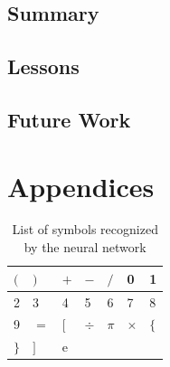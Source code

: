 \documentclass[10pt,twocolumn,letterpaper]{article}
\begin{document}
\subsection{Summary}


\subsection{Lessons}


\subsection{Future Work}


{\small


}

\section{Appendices}

\begin{table}[h]
\centering
\begin{tabular}{|l|l|l|l|l|l|l|}
\hline
$($ & $)$ & $+$ & $-$ & $/$ & 0 & 1 \\ \hline
2 & 3 & 4 & 5 & 6 & 7 & 8 \\ \hline
9 & $=$ & $[$ & $\div$ & $\pi$ & $\times$ & $\{$ \\ \hline
$\}$ & $]$ & e & $ $ & $ $ & & \\
\hline
\end{tabular}
\caption{List of symbols recognized by the neural network}
\label{tbl:symbollist}
\end{table}
\end{document}
